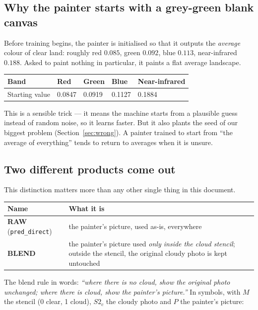 \documentclass[11pt,a4paper]{article}
\newcommand{\code}[1]{\texttt{#1}}
\newcommand{\term}[1]{\textbf{#1}}
\begin{document}
\subsection{Why the painter starts with a grey-green blank canvas}

Before training begins, the painter is initialised so that it outputs the \emph{average} colour of
clear land: roughly red $0.085$, green $0.092$, blue $0.113$, near-infrared $0.188$. Asked to paint
nothing in particular, it paints a flat average landscape.

\begin{center}
\begin{tabular}{@{}lllll@{}}
\hline
Band & Red & Green & Blue & Near-infrared \\
\hline
Starting value & 0.0847 & 0.0919 & 0.1127 & 0.1884 \\
\hline
\end{tabular}
\end{center}

This is a sensible trick --- it means the machine starts from a plausible guess instead of random
noise, so it learns faster. But it also plants the seed of our biggest problem
(Section~\ref{sec:wrong}). A painter trained to start from ``the average of everything'' tends to
return to averages when it is unsure.

\subsection{Two different products come out}

This distinction matters more than any other single thing in this document.

\begin{center}
\begin{tabular}{@{}lp{9.4cm}@{}}
\hline
\textbf{Name} & \textbf{What it is} \\
\hline
\term{RAW} (\code{pred\_direct}) & the painter's picture, used as-is, everywhere \\
\term{BLEND} & the painter's picture used \emph{only inside the cloud stencil}; outside the stencil, the original cloudy photo is kept untouched \\
\hline
\end{tabular}
\end{center}

The blend rule in words: \emph{``where there is no cloud, show the original photo unchanged; where
there is cloud, show the painter's picture.''} In symbols, with $M$ the stencil (0 clear, 1 cloud),
$S2_c$ the cloudy photo and $P$ the painter's picture:
\end{document}
